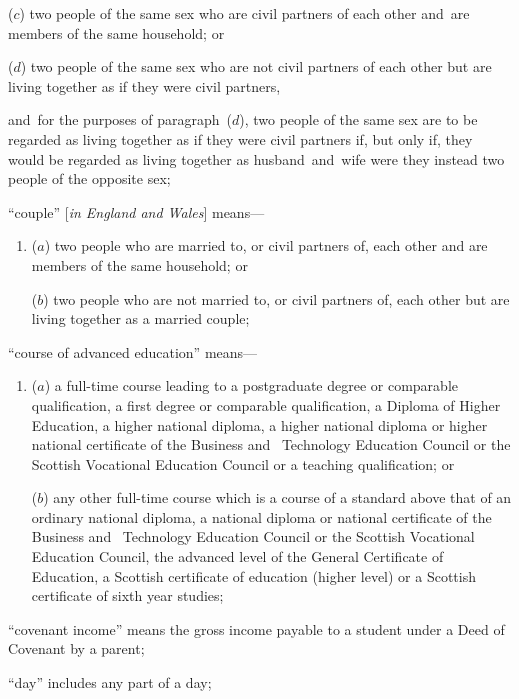 \documentclass[12pt,a4paper]{article}
\begin{document}
\begin{enumerate}
\begin{enumerate}
($c$) 
two people of the same sex who are civil partners of each other and~are members of the same household; or

($d$) 
two people of the same sex who are not civil partners of each other but are living together as if they were civil partners,
\end{enumerate}
and~for the purposes of paragraph~($d$), two people of the same sex are to be regarded as living together as if they were civil partners if, but only if, they would be regarded as living together as husband~and~wife were they instead two people of the opposite sex;

“couple” [\emph{in England and Wales}] means—
\begin{enumerate}\item[]
($a$) 
two people who are married to, or civil partners of, each other and are members of the same household; or

($b$) 
two people who are not married to, or civil partners of, each other but are living together as a married couple;
\end{enumerate}

“course of advanced education” means---
\begin{enumerate}\item[]
($a$)
a full-time course leading to a postgraduate degree or comparable qualification, a first degree or comparable qualification, a Diploma of Higher Education, a higher national diploma, a higher national diploma or higher national certificate of the Business and~
Technology %
Education Council or the Scottish Vocational Education Council or a teaching qualification; or

($b$)
any other full-time course which is a course of a standard above that of an ordinary national diploma, a national diploma or national certificate of the Business and~
Technology %
Education Council or the Scottish Vocational Education Council, the advanced level of the General Certificate of Education, a Scottish certificate of education (higher level) or a Scottish certificate of sixth year studies;
\end{enumerate}

“covenant income” means the gross income payable to a student under a Deed of Covenant by a parent;

“day” includes any part of a day;


\end{enumerate}
\end{document}
